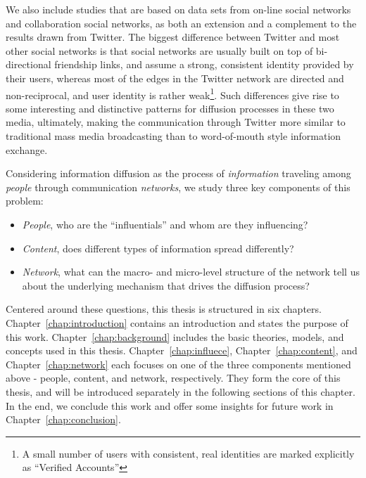 \documentclass[phd,tocprelim]{cornell}
\begin{document}
We also include studies that are based on data sets from on-line social networks and collaboration social networks, as both an extension and a complement to the results drawn from Twitter. The biggest difference between Twitter and most other social networks is that social networks are usually built on top of bi-directional friendship links, and assume a strong, consistent identity provided by their users, whereas most of the edges in the Twitter network are directed and non-reciprocal, and user identity is rather weak\footnote{A small number of users with consistent, real identities are marked explicitly as ``Verified Accounts''}. Such differences give rise to some interesting and distinctive patterns for diffusion processes in these two media, ultimately, making the communication through Twitter more similar to traditional mass media broadcasting than to word-of-mouth style information exchange.


Considering information diffusion as the process of \emph{information} traveling among \emph{people} through communication \emph{networks}, we study three key components of this problem:

\begin{itemize}
\item \emph{People}, who are the ``influentials'' and whom are they influencing?
\item \emph{Content}, does different types of information spread differently? 
\item \emph{Network}, what can the macro- and micro-level structure of the network tell us about the underlying mechanism that drives the diffusion process?
\end{itemize}

Centered around these questions, this thesis is structured in six chapters. Chapter~\ref{chap:introduction} contains an introduction and states the purpose  of this work. Chapter~\ref{chap:background} includes the basic theories, models, and concepts used in this thesis. Chapter~\ref{chap:influece}, Chapter~\ref{chap:content}, and Chapter~\ref{chap:network} each focuses on one of the three components mentioned above - people, content, and network, respectively. They form the core of this thesis, and will be introduced separately in the following sections of this chapter. In the end, we conclude this work and offer some insights for future work in Chapter~\ref{chap:conclusion}.   
\end{document}
